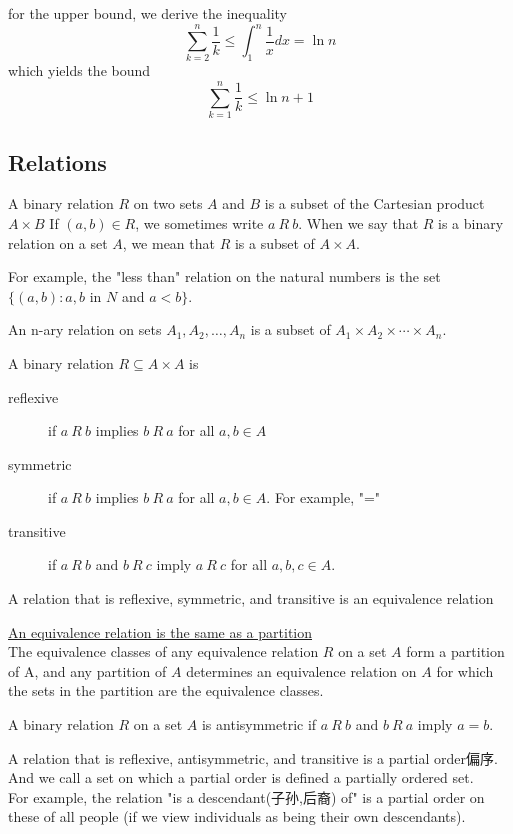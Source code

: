 \documentclass{article}
\begin{document}
for the upper bound, we derive the inequality
$$
\sum_{k=2}^n \frac{1}{k} \leq \int_1^{n}\frac{1}{x}dx = \ln n
$$
which yields the bound
$$
\sum_{k=1}^n \frac{1}{k} \leq \ln n + 1
$$

\subsection{Relations}
A binary relation $R$ on two sets $A$ and $B$ is a subset of the Cartesian product $A \times B$
If $(a, b) \in R$, we sometimes write $a\ R\ b$. When we say that $R$ is a binary relation on a set $A$, we mean that $R$ is a subset of $A \times A$.

For example, the "less than" relation on the natural numbers is the set $\{(a, b) : a, b$ in $N$ and $a < b\}$.

An n-ary relation on sets $A_1, A_2,\ldots, A_n$ is a subset of $A_1 \times A_2 \times \cdots \times  A_n$.

A binary relation $R \subseteq A \times A$ is
\begin{description}
  \item[reflexive] if $a\ R\ b$ implies $b\ R\ a$ for all $a,b \in A$
  \item[symmetric] if $a\ R\ b$ implies $b\ R\ a$ for all $a, b \in A$. For example, "="
  \item[transitive] if $a\ R\ b$ and $b\ R\ c$ imply $a\ R\ c$ for all $a, b, c \in A$.
\end{description}

A relation that is reflexive, symmetric, and transitive is an equivalence relation

\bigskip
\begin{theorem}
\underline{An equivalence relation is the same as a partition} \\
The equivalence classes of any equivalence relation $R$ on a set $A$ form a partition of A, and any partition of $A$ determines an equivalence relation on $A$ for which the sets in the partition are the equivalence classes.
\end{theorem}

\bigskip
A binary relation $R$ on a set $A$ is antisymmetric if $a\ R\ b$ and $b\ R\ a$ imply $a = b$.

A relation that is reflexive, antisymmetric, and transitive is a partial order偏序.\\
And we call a set on which a partial order is defined a partially ordered set.\\
For example, the relation "is a descendant(子孙,后裔) of" is a partial order on these of all people (if we view individuals as being their own descendants).
\end{document}
